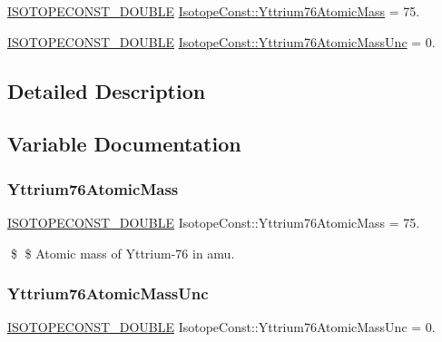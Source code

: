 \begin{DoxyCompactItemize}
\item 
\mbox{\hyperlink{group___isotope_const-_macros_ga8f45a7272ce02c0b4c65c44636ed719a}{I\+S\+O\+T\+O\+P\+E\+C\+O\+N\+S\+T\+\_\+\+D\+O\+U\+B\+LE}} \mbox{\hyperlink{group___isotope_const-_yttrium-_y76_ga52fdcec4e5e37dac2a1505c2eb3c6eac}{Isotope\+Const\+::\+Yttrium76\+Atomic\+Mass}} = 75.
\item 
\mbox{\hyperlink{group___isotope_const-_macros_ga8f45a7272ce02c0b4c65c44636ed719a}{I\+S\+O\+T\+O\+P\+E\+C\+O\+N\+S\+T\+\_\+\+D\+O\+U\+B\+LE}} \mbox{\hyperlink{group___isotope_const-_yttrium-_y76_ga3ef3166207ca42f9eaffb37ef06781c0}{Isotope\+Const\+::\+Yttrium76\+Atomic\+Mass\+Unc}} = 0.
\end{DoxyCompactItemize}


\subsection{Detailed Description}


\subsection{Variable Documentation}
\mbox{\label{group___isotope_const-_yttrium-_y76_ga52fdcec4e5e37dac2a1505c2eb3c6eac}} 
\subsubsection{\texorpdfstring{Yttrium76\+Atomic\+Mass}{Yttrium76AtomicMass}}
{\footnotesize\ttfamily \mbox{\hyperlink{group___isotope_const-_macros_ga8f45a7272ce02c0b4c65c44636ed719a}{I\+S\+O\+T\+O\+P\+E\+C\+O\+N\+S\+T\+\_\+\+D\+O\+U\+B\+LE}} Isotope\+Const\+::\+Yttrium76\+Atomic\+Mass = 75.}

\$ \$ Atomic mass of Yttrium-\/76 in amu. \mbox{\label{group___isotope_const-_yttrium-_y76_ga3ef3166207ca42f9eaffb37ef06781c0}} 
\subsubsection{\texorpdfstring{Yttrium76\+Atomic\+Mass\+Unc}{Yttrium76AtomicMassUnc}}
{\footnotesize\ttfamily \mbox{\hyperlink{group___isotope_const-_macros_ga8f45a7272ce02c0b4c65c44636ed719a}{I\+S\+O\+T\+O\+P\+E\+C\+O\+N\+S\+T\+\_\+\+D\+O\+U\+B\+LE}} Isotope\+Const\+::\+Yttrium76\+Atomic\+Mass\+Unc = 0.}


